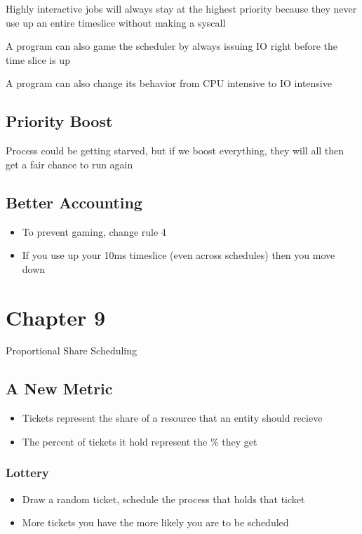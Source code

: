 \documentclass[11pt]{article}
\begin{document}
Highly interactive jobs will always stay at the highest priority because they never use up an entire timeslice without making a syscall

A program can also game the scheduler by always issuing IO right before the time slice is up

A program can also change its behavior from CPU intensive to IO intensive
\subsection{Priority Boost}
\label{sec:orgef2b7bf}
Process could be getting starved, but if we boost everything, they will all then get a fair chance to run again
\subsection{Better Accounting}
\label{sec:orgc462c34}
\begin{itemize}
\item To prevent gaming, change rule 4
\item If you use up your 10ms timeslice (even across schedules) then you move down
\end{itemize}
\section{Chapter 9}
\label{sec:org783703c}
Proportional Share Scheduling
\subsection{A New Metric}
\label{sec:org32b8f75}
\begin{itemize}
\item Tickets represent the share of a resource that an entity should recieve
\item The percent of tickets it hold represent the \% they get
\end{itemize}
\subsubsection{Lottery}
\label{sec:org876fbbe}
\begin{itemize}
\item Draw a random ticket, schedule the process that holds that ticket
\item More tickets you have the more likely you are to be scheduled
\end{itemize}
\end{document}
